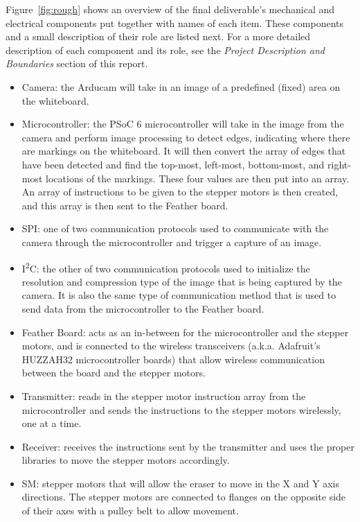 Figure~\ref{fig:rough} shows an overview of the final deliverable's mechanical and electrical components put together with names of each item. These components and a small description of their role are listed next. For a more detailed description of each component and its role, see the \textit{Project Description and Boundaries} section of this report.

\begin{itemize}
	\item Camera: the Arducam will take in an image of a predefined (fixed) area on the whiteboard.
	\item Microcontroller: the PSoC 6 microcontroller will take in the image from the camera and perform image processing to detect edges, indicating where there are markings on the whiteboard. It will then convert the array of edges that have been detected and find the top-most, left-most, bottom-most, and right-most locations of the markings. These four values are then put into an array. An array of instructions to be given to the stepper motors is then created, and this array is then sent to the Feather board.
	\item SPI: one of two communication protocols used to communicate with the camera through the microcontroller and trigger a capture of an image.
	\item I\textsuperscript{2}C: the other of two communication protocols used to initialize the resolution and compression type of the image that is being captured by the camera. It is also the same type of communication method that is used to send data from the microcontroller to the Feather board.
	\item Feather Board: acts as an in-between for the microcontroller and the stepper motors, and is connected to the wireless transceivers (a.k.a. Adafruit's HUZZAH32 microcontroller boards) that allow wireless communication between the board and the stepper motors.
	\item Transmitter: reads in the stepper motor instruction array from the microcontroller and sends the instructions to the stepper motors wirelessly, one at a time.
	\item Receiver: receives the instructions sent by the transmitter and uses the proper libraries to move the stepper motors accordingly.
	\item SM: stepper motors that will allow the eraser to move in the X and Y axis directions. The stepper motors are connected to flanges on the opposite side of their axes with a pulley belt to allow movement.

\end{itemize}
